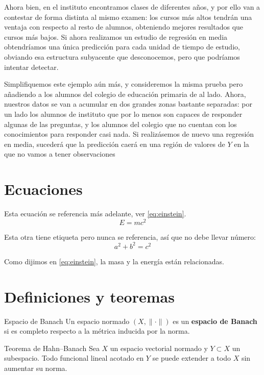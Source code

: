 	Ahora bien, en el instituto encontramos clases de diferentes años, y por ello van a contestar de forma distinta al mismo examen: los cursos más altos tendrán una ventaja con respecto al resto de alumnos, obteniendo mejores resultados que cursos más bajos. Si ahora realizamos un estudio de regresión en media obtendríamos una única predicción para cada unidad de tiempo de estudio, obviando esa estructura subyacente que desconocemos, pero que podríamos intentar detectar. 
	
	Simplifiquemos este ejemplo aún más, y consideremos la misma prueba pero añadiendo a los alumnos del colegio de educación primaria de al lado. Ahora, nuestros datos se van a acumular en dos grandes zonas bastante separadas: por un lado los alumnos de instituto que por lo menos son capaces de responder algunas de las preguntas, y los alumnos del colegio que no cuentan con los conocimientos para responder casi nada. Si realizásemos de nuevo una regresión en media, sucederá que la predicción caerá en una región de valores de $Y$ en la que no vamos a tener observaciones 
	
	\section{Ecuaciones}
	
	Esta ecuación se referencia más adelante, ver \eqref{eq:einstein}.
	\begin{equation}
		E = mc^2 \label{eq:einstein}
	\end{equation}
	
	Esta otra tiene etiqueta pero nunca se referencia, así que no debe
	llevar número:
	\[
	a^2+b^2=c^2 
	\]
	
	
	Como dijimos en \eqref{eq:einstein}, la masa y la energía están
	relacionadas.
	
	\section{Definiciones y teoremas}
	
	\begin{definition}{Espacio de Banach}
		Un espacio normado $(X,\|\cdot\|)$ es un \textbf{espacio de Banach} si
		es completo respecto a la métrica inducida por la norma.
	\end{definition}
	
	\begin{theorem}{Teorema de Hahn--Banach}
		Sea $X$ un espacio vectorial normado y $Y\subset X$ un subespacio.
		Todo funcional lineal acotado en $Y$ se puede extender a todo $X$ sin
		aumentar su norma.
	\end{theorem}
	
